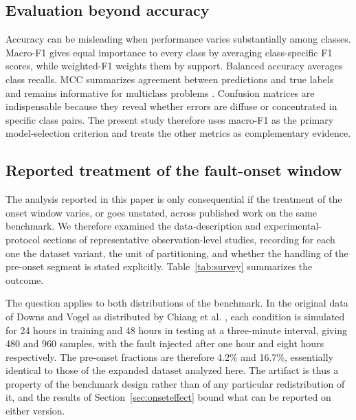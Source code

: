 \documentclass[10pt,twocolumn,a4paper]{article}
\begin{document}
\subsection{Evaluation beyond accuracy}

Accuracy can be misleading when performance varies substantially among classes.
Macro-F1 gives equal importance to every class by averaging class-specific F1
scores, while weighted-F1 weights them by support. Balanced accuracy averages
class recalls. MCC summarizes agreement between predictions and true labels and
remains informative for multiclass problems \cite{matthews1975mcc}. Confusion
matrices are indispensable because they reveal whether errors are diffuse or
concentrated in specific class pairs. The present study therefore uses
macro-F1 as the primary model-selection criterion and treats the other metrics
as complementary evidence.

\subsection{Reported treatment of the fault-onset window}
\label{sec:survey}

The analysis reported in this paper is only consequential if the treatment of
the onset window varies, or goes unstated, across published work on the same
benchmark. We therefore examined the data-description and experimental-protocol
sections of representative observation-level studies, recording for each one
the dataset variant, the unit of partitioning, and whether the handling of the
pre-onset segment is stated explicitly. Table~\ref{tab:survey} summarizes the
outcome.

The question applies to both distributions of the benchmark. In the original
data of Downs and Vogel as distributed by Chiang et al.
\cite{downs1993tep,chiang2001book}, each condition is simulated for 24 hours in
training and 48 hours in testing at a three-minute interval, giving 480 and 960
samples, with the fault injected after one hour and eight hours respectively.
The pre-onset fractions are therefore 4.2\% and 16.7\%, essentially identical
to those of the expanded dataset analyzed here. The artifact is thus a property
of the benchmark design rather than of any particular redistribution of it,
and the results of Section~\ref{sec:onseteffect} bound what can be reported on
either version.
\end{document}
